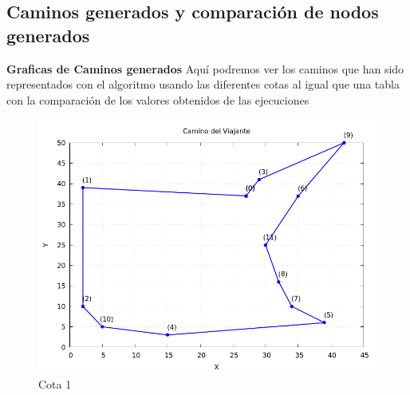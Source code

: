 \documentclass[11pt,openany]{book}
\begin{document}
\newpage


\subsection{Caminos generados y comparación de nodos generados}
\textbf{Graficas de Caminos generados }
Aquí podremos ver los caminos que han sido representados con el algoritmo usando las diferentes cotas al igual que una tabla con la comparación de los valores obtenidos de las ejecuciones

\begin{figure}[H]
    \centering

    \begin{minipage}{.48\textwidth}
          \centering
          \includegraphics[width=1\linewidth]{assets/Img/cota1camino.png}
          \caption{Cota 1}
          \label{fig:Cota 1 camino }
    \end{minipage}%
\end{figure}
\end{document}
